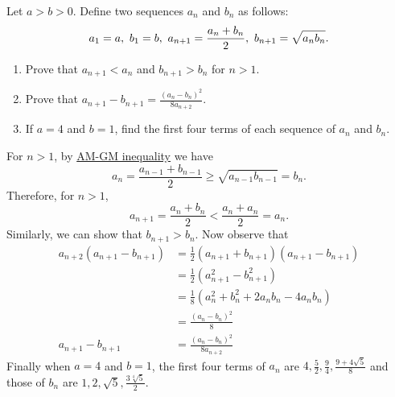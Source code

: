 \begin{question}
    Let $a > b > 0$. Define two sequences $a_{n}$ and $b_{n}$ as follows:
    \[a_{1} = a,\text{\space} b_{1} = b,\text{\space} a_{n + 1} = \frac{a_{n} +
    b_{n}}{2},\text{\space} b_{n + 1} = \sqrt{a_{n}b_{n}}.\]
    \begin{enumerate}
        \item Prove that $a_{n + 1} < a_{n}$ and $b_{n + 1} > b_{n}$ for $n >
            1$. 
        
        \item Prove that $a_{n + 1} - b_{n + 1} = \frac{(a_{n} -
            b_{n})^2}{8a_{n + 2}}$. 
        
        \item If $a = 4$ and $b = 1$, find the first four terms of each
            sequence of $a_{n}$ and $b_{n}$.
    \end{enumerate}
\end{question}
\begin{solution}
    For $n > 1$, by \hyperref[thm: amgm]{AM-GM inequality} we have 
    \[ a_n = \frac{a_{n - 1} + b_{n - 1}}{2} \geq \sqrt{a_{n - 1}b_{n - 1}} =
    b_n. \]
    Therefore, for $n > 1$,
    \[ a_{n + 1} = \frac{a_n + b_n}{2} < \frac{a_n + a_n}{2} = a_n. \]
    Similarly, we can show that $b_{n + 1} > b_n$.
    Now observe that
    \begin{align*}
        a_{n + 2}(a_{n + 1} - b_{n + 1}) &= \frac{1}{2}(a_{n + 1} + b_{n + 1})(a_{n + 1} - b_{n + 1})\\
        &= \frac{1}{2}(a_{n + 1}^2 - b_{n + 1}^2)\\
        &= \frac{1}{8}(a_n^2 + b_n^2 + 2a_nb_n - 4a_nb_n)\\
        &= \frac{(a_n - b_n)^2}{8}\\
        a_{n + 1} - b_{n + 1} &= \frac{(a_n - b_n)^2}{8a_{n + 2}}
    \end{align*} 
    Finally when $a = 4$ and $b = 1$, the first four terms of $a_n$ are $4,
    \frac{5}{2}, \frac{9}{4}, \frac{9 + 4\sqrt{5}}{8}$ and those of $b_n$ are
    $1, 2, \sqrt{5}, \frac{3 \sqrt[4]{5}}{2}$.
\end{solution}

